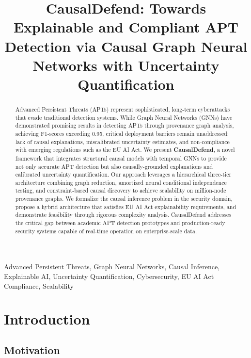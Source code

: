 \documentclass[conference]{IEEEtran}
\begin{document}
\title{CausalDefend: Towards Explainable and Compliant APT Detection via Causal Graph Neural Networks with Uncertainty Quantification}

\author{
}

\maketitle

\begin{abstract}
Advanced Persistent Threats (APTs) represent sophisticated, long-term cyberattacks that evade traditional detection systems. While Graph Neural Networks (GNNs) have demonstrated promising results in detecting APTs through provenance graph analysis, achieving F1-scores exceeding 0.95, critical deployment barriers remain unaddressed: lack of causal explanations, miscalibrated uncertainty estimates, and non-compliance with emerging regulations such as the EU AI Act. We present \textbf{CausalDefend}, a novel framework that integrates structural causal models with temporal GNNs to provide not only accurate APT detection but also causally-grounded explanations and calibrated uncertainty quantification. Our approach leverages a hierarchical three-tier architecture combining graph reduction, amortized neural conditional independence testing, and constraint-based causal discovery to achieve scalability on million-node provenance graphs. We formalize the causal inference problem in the security domain, propose a hybrid architecture that satisfies EU AI Act explainability requirements, and demonstrate feasibility through rigorous complexity analysis. CausalDefend addresses the critical gap between academic APT detection prototypes and production-ready security systems capable of real-time operation on enterprise-scale data.
\end{abstract}

\begin{IEEEkeywords}
Advanced Persistent Threats, Graph Neural Networks, Causal Inference, Explainable AI, Uncertainty Quantification, Cybersecurity, EU AI Act Compliance, Scalability
\end{IEEEkeywords}

\section{Introduction}

\subsection{Motivation}
\end{document}
